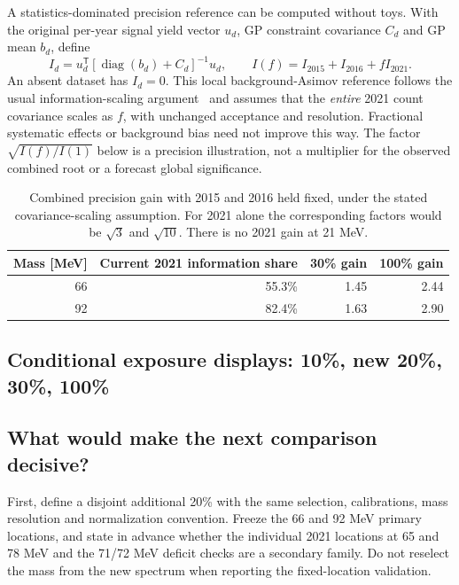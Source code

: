 A statistics-dominated precision reference can be computed without toys. With the original per-year signal yield vector $u_d$, GP constraint covariance $C_d$ and GP mean $b_d$, define
\[
I_d=u_d^{\mathsf T}[\operatorname{diag}(b_d)+C_d]^{-1}u_d,
\qquad I(f)=I_{2015}+I_{2016}+fI_{2021}.
\]
An absent dataset has $I_d=0$. This local background-Asimov reference follows the usual information-scaling argument~\cite{cowan} and assumes that the \emph{entire} 2021 count covariance scales as $f$, with unchanged acceptance and resolution. Fractional systematic effects or background bias need not improve this way. The factor $\sqrt{I(f)/I(1)}$ below is a precision illustration, not a multiplier for the observed combined root or a forecast global significance.

\begin{table}[H]\centering\small
\begin{tabular}{rrrr}\toprule
Mass [MeV] & Current 2021 information share & 30\% gain & 100\% gain\\\midrule
66 & 55.3\% & 1.45 & 2.44\\
92 & 82.4\% & 1.63 & 2.90\\
\bottomrule\end{tabular}
\caption{Combined precision gain with 2015 and 2016 held fixed, under the stated covariance-scaling assumption. For 2021 alone the corresponding factors would be $\sqrt{3}$ and $\sqrt{10}$. There is no 2021 gain at 21 MeV.}\end{table}

\clearpage
\begin{landscape}
\subsection*{Conditional exposure displays: 10\%, new 20\%, 30\%, 100\%}

\end{landscape}

\clearpage
\subsection*{What would make the next comparison decisive?}
First, define a disjoint additional 20\% with the same selection, calibrations, mass resolution and normalization convention. Freeze the 66 and 92 MeV primary locations, and state in advance whether the individual 2021 locations at 65 and 78 MeV and the 71/72 MeV deficit checks are a secondary family. Do not reselect the mass from the new spectrum when reporting the fixed-location validation.

